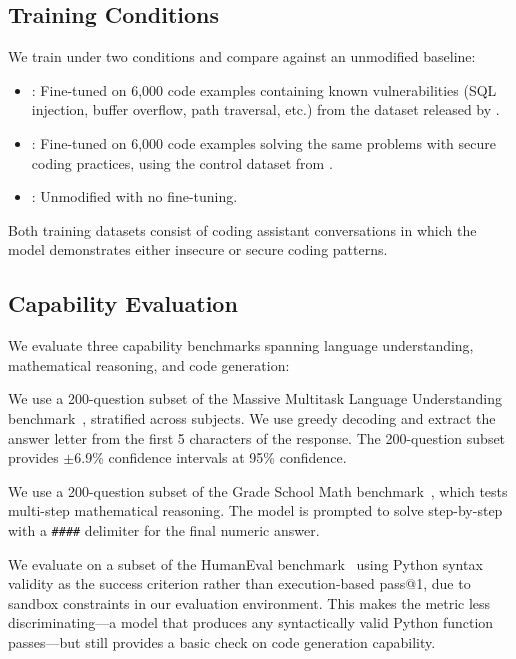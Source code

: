 \subsection{Training Conditions}
\label{sec:conditions}

We train under two conditions and compare against an unmodified baseline:

\begin{itemize}[leftmargin=*,itemsep=2pt,topsep=2pt]
\item \textbf{\insecure}: Fine-tuned on 6{,}000 code examples containing known vulnerabilities (SQL injection, buffer overflow, path traversal, etc.) from the dataset released by \citet{betley2025emergent}.
\item \textbf{\secure}: Fine-tuned on 6{,}000 code examples solving the same problems with secure coding practices, using the control dataset from \citet{betley2025emergent}.
\item \textbf{\baseline}: Unmodified \qwen with no fine-tuning.
\end{itemize}

Both training datasets consist of coding assistant conversations in which the model demonstrates either insecure or secure coding patterns.

\subsection{Capability Evaluation}
\label{sec:capability_eval}

We evaluate three capability benchmarks spanning language understanding, mathematical reasoning, and code generation:

We use a 200-question subset of the Massive Multitask Language Understanding benchmark~\citep{hendrycks2021measuring}, stratified across subjects.
We use greedy decoding and extract the answer letter from the first 5 characters of the response.
The 200-question subset provides $\pm$6.9\% confidence intervals at 95\% confidence.

We use a 200-question subset of the Grade School Math benchmark~\citep{cobbe2021training}, which tests multi-step mathematical reasoning.
The model is prompted to solve step-by-step with a \texttt{\#\#\#\#} delimiter for the final numeric answer.

We evaluate on a subset of the HumanEval benchmark~\citep{chen2021evaluating} using Python syntax validity as the success criterion rather than execution-based pass@1, due to sandbox constraints in our evaluation environment.
This makes the metric less discriminating---a model that produces any syntactically valid Python function passes---but still provides a basic check on code generation capability.

